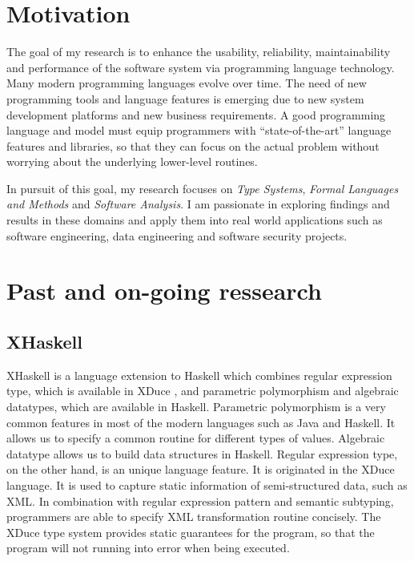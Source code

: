\documentclass[12pt]{article}
\theoremstyle{plain} \numberwithin{equation}{section}
\theoremstyle{definition}
\newcommand{\kl}[1]{}
\begin{document}
\raisebox{1cm}



\section{Motivation}

\kl{What is the goal of my research?}
The goal of my research is to enhance the usability, reliability, 
maintainability and performance of the software system via programming language
technology. Many modern programming languages evolve over time.
The need of new programming tools and language features is 
emerging due to new system development platforms and new 
business requirements. A good programming language and model must equip
programmers with ``state-of-the-art'' language features
and libraries, so that they can focus on the actual problem without
worrying about the underlying lower-level routines.


\kl{What is the focus?}
In pursuit of this goal, my research focuses on
{\em Type Systems},  {\em Formal Languages and Methods} and {\em Software Analysis}.
I am passionate in exploring findings and results in these domains and apply them into real world applications
such as software engineering, data engineering and software security projects.


\section{Past and on-going ressearch}

\subsection{XHaskell}
XHaskell is a language extension to Haskell \cite{xhaskell} 
which combines regular expression type, 
which is available in XDuce \cite{XDuceTyPHD}, and parametric
polymorphism and algebraic datatypes, which are available in Haskell.
Parametric polymorphism is a very common features in most of the 
modern languages such as Java and Haskell. It allows us to specify a
common routine for different types of values. Algebraic datatype
allows us to build data structures in Haskell. Regular expression
type, on the other hand, is an unique language feature. 
It is originated in the XDuce language. It is used to capture
static information of semi-structured data, such as XML. In
combination with regular expression pattern and semantic subtyping,
programmers are able to specify XML transformation routine concisely.
The XDuce type system provides static guarantees for the program, so that
the program will not running into error when being executed. 
\end{document}
